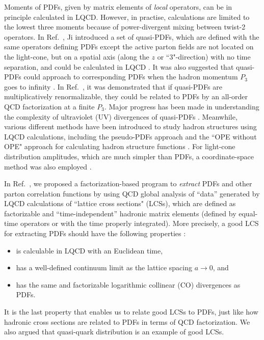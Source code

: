 \documentclass[twocolumn,aps,prl,superscriptaddress,nofootinbib,showpacs]{revtex4-1}
\begin{document}
Moments of PDFs, given by matrix elements of {\it local} operators, can be in principle calculated in LQCD. However, in practise, calculations are limited to the lowest three moments \cite{Nocera:2017war} because of power-divergent mixing between twist-2 operators.  In Ref.~\cite{Ji:2013dva}, Ji introduced a set of quasi-PDFs, which are defined with the same operators defining PDFs except the active parton fields are not located on the light-cone, but on a spatial axis (along the $z$ or ``$3$"-direction) with no time separation, and could be calculated in LQCD \cite{Lin:2014zya,Alexandrou:2015rja,Chen:2016utp,Alexandrou:2016jqi,Zhang:2017bzy}. It was also suggested that quasi-PDFs could approach to corresponding PDFs when the hadron momentum $P_3$ goes to infinity  \cite{Ji:2013dva,Ji:2014gla,Ji:2017rah}. In Ref.~\cite{Ma:2014jla}, it was demonstrated that if quasi-PDFs are multiplicatively renormalizable, they could be related to PDFs by an all-order QCD factorization at a finite $P_3$. Major progress has been made in understanding the complexity of ultraviolet (UV) divergences of quasi-PDFs \cite{Ishikawa:2016znu,Chen:2016fxx,Monahan:2016bvm,Briceno:2017cpo, Xiong:2017jtn, Constantinou:2017sej, Alexandrou:2017huk, Chen:2017mzz,Ji:2017oey,Ishikawa:2017faj,Green:2017xeu}. Meanwhile, various different methods have been introduced to study hadron structures using LQCD calculations, including the pseudo-PDFs approach \cite{Orginos:2017kos} and  the ``OPE without OPE" approach  \cite{Chambers:2017dov} for calculating hadron structure functions \cite{Liu:1993cv,Liu:1999ak,Liu:2016djw}. For light-cone distribution amplitudes, which are much simpler than PDFs, a coordinate-space method was also employed \cite{Aglietti:1998ur,Abada:2001if,Braun:2007wv}.

In Ref.~\cite{Ma:2014jla}, we proposed a factorization-based program to {\it extract} PDFs and other parton correlation functions by using QCD global analysis of ``data'' generated by LQCD calculations of ``lattice cross sections" (LCSs), which are defined as factorizable and ``time-independent'' hadronic matrix elements (defined by equal-time operators or with the time properly integrated).  More precisely, a good LCS for extracting PDFs should have the following properties \cite{Ma:2014jla}:
\begin{itemize}
\item
is calculable in LQCD with an Euclidean time,
\item
has a well-defined continuum limit as the lattice spacing $a\to 0$, and
\item
has the same and factorizable logarithmic collinear (CO) divergences as PDFs.
\end{itemize}
It is the last property that enables us to relate good LCSs to PDFs, just like how
hadronic cross sections are related to PDFs in terms of QCD factorization. We also argued that quasi-quark distribution is an example of good LCSs.
\end{document}
